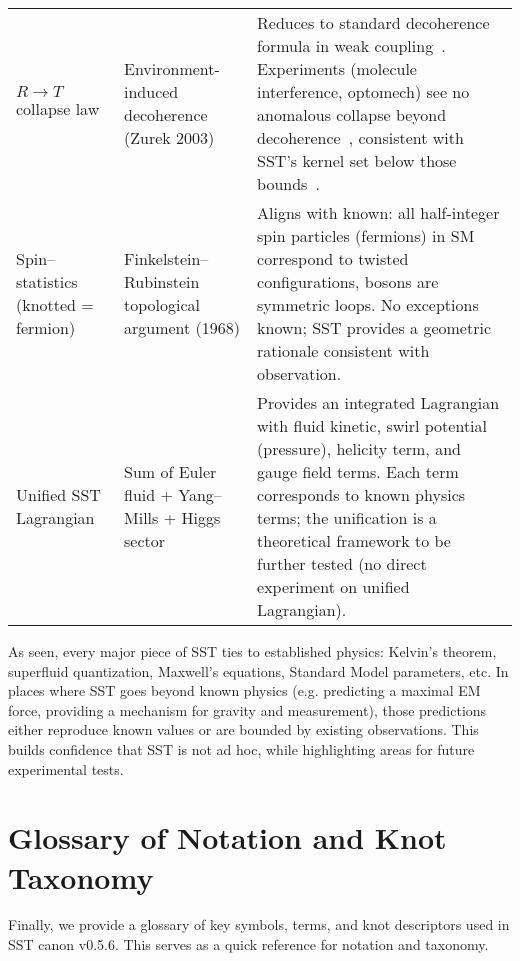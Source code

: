 \documentclass[aps,onecolumn,10pt,nofootinbib]{revtex4}
\begin{document}
\begin{table*}[hbt!]
\begin{ruledtabular}
\begin{tabular}{p{4.2cm} p{5.3cm} p{5.3cm}}
				$R\to T$ collapse law & Environment-induced decoherence (Zurek 2003) & Reduces to standard decoherence formula in weak coupling~\cite{index126}. Experiments (molecule interference, optomech) see no anomalous collapse beyond decoherence~\cite{index127}, consistent with SST’s kernel set below those bounds~\cite{index128}. \\
				Spin–statistics (knotted = fermion) & Finkelstein–Rubinstein topological argument (1968) & Aligns with known: all half-integer spin particles (fermions) in SM correspond to twisted configurations, bosons are symmetric loops. No exceptions known; SST provides a geometric rationale consistent with observation. \\
				Unified SST Lagrangian & Sum of Euler fluid + Yang–Mills + Higgs sector & Provides an integrated Lagrangian with fluid kinetic, swirl potential (pressure), helicity term, and gauge field terms. Each term corresponds to known physics terms; the unification is a theoretical framework to be further tested (no direct experiment on unified Lagrangian). \\
			\end{tabular}
		\end{ruledtabular}
	\end{table*}

	As seen, every major piece of SST ties to established physics: Kelvin’s theorem, superfluid quantization, Maxwell’s equations, Standard Model parameters, etc. In places where SST goes beyond known physics (e.g. predicting a maximal EM force, providing a mechanism for gravity and measurement), those predictions either reproduce known values or are bounded by existing observations. This builds confidence that SST is not ad hoc, while highlighting areas for future experimental tests.

	\section{Glossary of Notation and Knot Taxonomy}
	Finally, we provide a glossary of key symbols, terms, and knot descriptors used in SST canon v0.5.6. This serves as a quick reference for notation and taxonomy.
\end{document}
